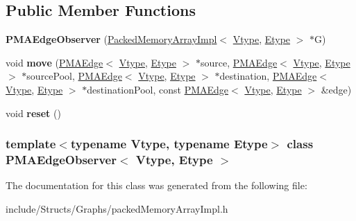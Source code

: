 \subsection*{Public Member Functions}
\begin{DoxyCompactItemize}
\item 
\hypertarget{class_p_m_a_edge_observer_aa8cab9f5ced82dd5d38ed0ad96397e3e}{
{\bfseries PMAEdgeObserver} (\hyperlink{class_packed_memory_array_impl}{PackedMemoryArrayImpl}$<$ \hyperlink{class_vtype}{Vtype}, \hyperlink{class_etype}{Etype} $>$ $\ast$G)}
\label{class_p_m_a_edge_observer_aa8cab9f5ced82dd5d38ed0ad96397e3e}

\item 
\hypertarget{class_p_m_a_edge_observer_ab423ce0c35e871d22b39e33e54cc5807}{
void {\bfseries move} (\hyperlink{class_p_m_a_edge}{PMAEdge}$<$ \hyperlink{class_vtype}{Vtype}, \hyperlink{class_etype}{Etype} $>$ $\ast$source, \hyperlink{class_p_m_a_edge}{PMAEdge}$<$ \hyperlink{class_vtype}{Vtype}, \hyperlink{class_etype}{Etype} $>$ $\ast$sourcePool, \hyperlink{class_p_m_a_edge}{PMAEdge}$<$ \hyperlink{class_vtype}{Vtype}, \hyperlink{class_etype}{Etype} $>$ $\ast$destination, \hyperlink{class_p_m_a_edge}{PMAEdge}$<$ \hyperlink{class_vtype}{Vtype}, \hyperlink{class_etype}{Etype} $>$ $\ast$destinationPool, const \hyperlink{class_p_m_a_edge}{PMAEdge}$<$ \hyperlink{class_vtype}{Vtype}, \hyperlink{class_etype}{Etype} $>$ \&edge)}
\label{class_p_m_a_edge_observer_ab423ce0c35e871d22b39e33e54cc5807}

\item 
\hypertarget{class_p_m_a_edge_observer_ae8cd9888cba9f1dcbc8b4f4f83a0ca79}{
void {\bfseries reset} ()}
\label{class_p_m_a_edge_observer_ae8cd9888cba9f1dcbc8b4f4f83a0ca79}

\end{DoxyCompactItemize}
\subsubsection*{template$<$typename Vtype, typename Etype$>$ class PMAEdgeObserver$<$ Vtype, Etype $>$}



The documentation for this class was generated from the following file:\begin{DoxyCompactItemize}
\item 
include/Structs/Graphs/packedMemoryArrayImpl.h\end{DoxyCompactItemize}
